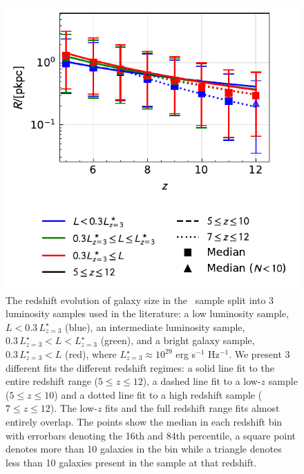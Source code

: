 \begin{figure}
	\includegraphics[width=\columnwidth]{Figures/Violin_ObsCompHalfLightRadius_evolution_pix_FAKE.TH.FUV_sim_default_All.pdf}
    \caption{The redshift evolution of galaxy size in the \flares\ sample split into 3 luminosity samples used in the literature: a low luminosity sample, $L < 0.3 \, L_{z=3}^{\star}$ (blue), an intermediate luminosity sample, $0.3 \, L_{z=3}^{\star} < L < L_{z=3}^{\star}$ (green), and a bright galaxy sample, $0.3 \, L_{z=3}^{\star}<L$ (red), where $L_{z=3}^{\star}\approx10^{29}$ erg s$^{-1}$ Hz$^{-1}$. We present 3 different fits the different redshift regimes: a solid line fit to the entire redshift range ($5 \leq z \leq 12$), a dashed line fit to a low-$z$ sample ($5 \leq z \leq 10$) and a dotted line fit to a high redshift sample ($7 \leq z \leq 12$). The low-$z$ fits and the full redshift range fits almost entirely overlap.
    The points show the median in each redshift bin with errorbars denoting the 16th and 84th percentile, a square point denotes more than 10 galaxies in the bin while a triangle denotes less than 10 galaxies present in the sample at that redshift.}
    \label{fig:evo}
\end{figure}

